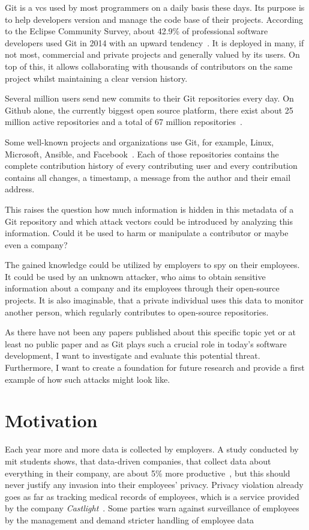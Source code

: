Git is a \ac{vcs} used by most programmers on a daily basis these days.
Its purpose is to help developers version and manage the code base of their projects.
According to the Eclipse Community Survey, about 42.9\% of professional software developers used Git in 2014 with an upward tendency~\cite{article:git-popularity}.
It is deployed in many, if not most, commercial and private projects and generally valued by its users.
On top of this, it allows collaborating with thousands of contributors on the same project whilst maintaining a clear version history.

Several million users send new commits to their Git repositories every day.
On Github alone, the currently biggest open source platform, there exist about 25 million active repositories and a total of 67 million repositories~\cite{article:github-statistics}.

Some well-known projects and organizations use Git, for example, Linux, Microsoft, Ansible, and Facebook~\cite{article:github-statistics}.
Each of those repositories contains the complete contribution history of every contributing user and every contribution contains all changes, a timestamp, a message from the author and their email address.

This raises the question how much information is hidden in this metadata of a Git repository and which attack vectors could be introduced by analyzing this information.
Could it be used to harm or manipulate a contributor or maybe even a company?

The gained knowledge could be utilized by employers to spy on their employees.
It could be used by an unknown attacker, who aims to obtain sensitive information about a company and its employees through their open-source projects.
It is also imaginable, that a private individual uses this data to monitor another person, which regularly contributes to open-source repositories.

As there have not been any papers published about this specific topic yet or at least no public paper and as Git plays such a crucial role in today's software development, I want to investigate and evaluate this potential threat.
Furthermore, I want to create a foundation for future research and provide a first example of how such attacks might look like.

\section{Motivation}
Each year more and more data is collected by employers.
A study conducted by \ac{mit} students shows, that data-driven companies, that collect data about everything in their company, are about 5\% more productive~\cite{article:management-revolution}, but this should never justify any invasion into their employees' privacy.
Privacy violation already goes as far as tracking medical records of employees, which is a service provided by the company \emph{Castlight}~\cite{article:medical-data}.
Some parties warn against surveillance of employees by the management and demand stricter handling of employee data~\cite{article:vermessung-belegschaft}

